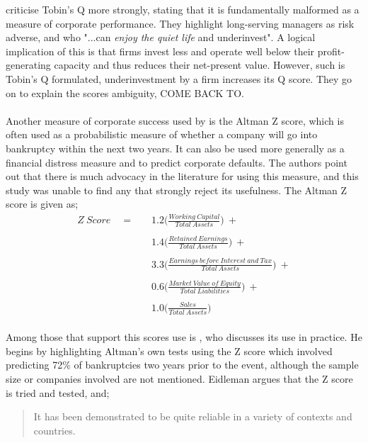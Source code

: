 {\cite {dybvig2010tobin} criticise Tobin's Q more strongly, stating that it is fundamentally malformed as a measure of corporate performance. They highlight long-serving managers as risk adverse, and who "...can {\it enjoy the quiet life} and underinvest". A logical implication of this is that firms invest less and operate well below their profit-generating capacity and thus reduces their net-present value. However, such is Tobin's Q formulated, underinvestment by a firm increases its Q score. They go on to explain the scores ambiguity, COME BACK TO. \\\\Another measure of corporate success used by \cite{moldovan2015learning} is the Altman Z score, which is often used as a probabilistic measure of whether a company will go into bankruptcy within the next two years. It can also be used more generally as a financial distress measure and to predict corporate defaults. The authors point out that there is much advocacy in the literature for using this measure, and this study was unable to find any that strongly reject its usefulness. The Altman Z score is given as;
\begin {equation}\label{AltmanZScore}
\begin{aligned}
Z \ Score \quad = \quad & 1.2\bigg(\frac{Working \ Capital}{Total \ Assets}\bigg) \ + \\\\
		& 1.4\bigg({\frac{Retained \ Earnings}{Total \ Assets}}\bigg) \ + \\\\
		& 3.3\bigg({\frac{Earnings \ before \ Interest \ and \ Tax}{Total \ Assets}}\bigg) \ + \\\\
		& 0.6\bigg({\frac{Market \ Value \ of \ Equity}{Total \ Liabilities}}\bigg) \ + \\\\
		& 1.0\bigg({\frac{Sales}{Total \ Assets}}\bigg)
\end{aligned}
\end{equation}\\
Among those that support this scores use is \cite {eidleman1995z}, who discusses its use in practice. He begins by highlighting Altman's own tests using the Z score which involved predicting 72\% of bankruptcies two years prior to the event, although the sample size or companies involved are not mentioned. Eidleman argues that the Z score is tried and tested, and;
\begin {quote}
It has been demonstrated to be quite reliable in a variety of contexts and countries. 


\end{quote}}
